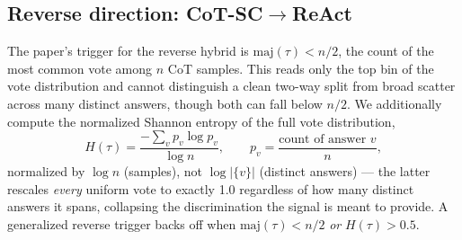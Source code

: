 \subsection{Reverse direction: CoT-SC$\to$ReAct}
The paper's trigger for the reverse hybrid is
$\mathrm{maj}(\tau) < n/2$, the count of the most common vote among $n$
CoT samples. This reads only the top bin of the vote distribution and
cannot distinguish a clean two-way split from broad scatter across many
distinct answers, though both can fall below $n/2$. We additionally
compute the normalized Shannon entropy of the full vote distribution,
\[
H(\tau) = \frac{-\sum_{v} p_v \log p_v}{\log n}, \qquad
  p_v = \frac{\text{count of answer } v}{n},
\]
normalized by $\log n$ (samples), not $\log|\{v\}|$ (distinct answers) ---
the latter rescales \emph{every} uniform vote to exactly 1.0 regardless of
how many distinct answers it spans, collapsing the discrimination the
signal is meant to provide. A generalized reverse trigger backs off when
$\mathrm{maj}(\tau) < n/2$ \emph{or} $H(\tau) > 0.5$.
